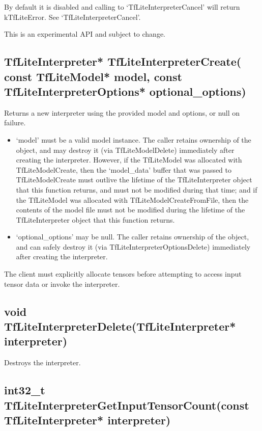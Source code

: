 \documentclass{ol-softwaremanual}
\begin{document}
By default it is disabled and calling to `TfLiteInterpreterCancel' will return kTfLiteError. See `TfLiteInterpreterCancel'.

This is an experimental API and subject to change.

\subsection{TfLiteInterpreter* TfLiteInterpreterCreate(
    const TfLiteModel* model, const TfLiteInterpreterOptions* optional\_options)}

Returns a new interpreter using the provided model and options, or null on failure.

\begin{itemize}
    \item `model' must be a valid model instance. The caller retains ownership of the object, and may destroy it (via TfLiteModelDelete) immediately after creating the interpreter.  However, if the TfLiteModel was allocated with TfLiteModelCreate, then the `model\_data' buffer that was passed to TfLiteModelCreate must outlive the lifetime of the TfLiteInterpreter object that this function returns, and must not be modified during that time; and if the TfLiteModel was allocated with TfLiteModelCreateFromFile, then the contents of the model file must not be modified during the lifetime of the TfLiteInterpreter object that this function returns.
    
    \item `optional\_options' may be null. The caller retains ownership of the object, and can safely destroy it (via TfLiteInterpreterOptionsDelete) immediately after creating the interpreter.
\end{itemize}

The client must explicitly allocate tensors before attempting to access input tensor data or invoke the interpreter.

\subsection{void TfLiteInterpreterDelete(TfLiteInterpreter* interpreter)}

Destroys the interpreter.

\subsection{int32\_t TfLiteInterpreterGetInputTensorCount(const TfLiteInterpreter* interpreter)}
\end{document}
